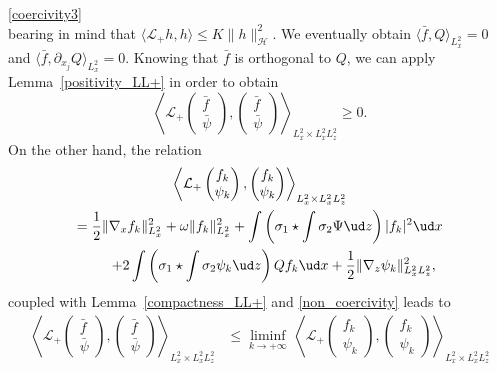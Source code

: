 \begin{ProofOf}{\eqref{coercivity3}}
\[\]
bearing in mind that $\langle\mathcal{L}_{+} h,h\rangle\leq K\|h\|_{\mathscr{H}}^{2}$. We eventually obtain $\langle\bar{f},Q\rangle_{L_{x}^{2}}=0$ and $\langle\bar{f},\partial_{x_{j}}Q\rangle_{L_{x}^{2}}=0$. Knowing that $\bar{f}$ is orthogonal to $Q$, we can apply Lemma~\ref{positivity_LL+} in order to obtain
\[
\left\langle\mathcal{L}_{+}\begin{pmatrix} \bar{f}\\\bar{\psi} \end{pmatrix},\begin{pmatrix} \bar{f}\\\bar{\psi} \end{pmatrix}\right\rangle_{L_{x}^{2}\times L_{x}^{2}L_{z}^{2}}\geq 0.
\]
On the other hand, the relation
\begin{multline*}
\left\langle\mathcal{L}_{+}\begin{pmatrix} f_{k}\\\psi_{k} \end{pmatrix},\begin{pmatrix} f_{k}\\\psi_{k} \end{pmatrix}\right\rangle_{L_{x}^{2}\times L_{x}^{2}L_{z}^{2}}
\\
=\frac{1}{2}\|\nabla_{x}f_{k}\|_{L_{x}^{2}}^{2}+\omega\|f_{k}\|_{L_{x}^{2}}^{2}+\int\left(\sigma_{1}\star\int\sigma_{2}\Psi\ud z\right)|f_{k}|^{2}\ud x\\
\qquad +2\int\left(\sigma_{1}\star\int\sigma_{2}\psi_{k}\ud z\right)Qf_{k}\ud x+\frac{1}{2}\|\nabla_{z}\psi_{k}\|_{L_{x}^{2}L_{z}^{2}}^{2},
\end{multline*}
coupled with Lemma~\ref{compactness_LL+} and \eqref{non_coercivity} leads to
\begin{align*}
\left\langle\mathcal{L}_{+}\begin{pmatrix} \bar{f}\\\bar{\psi} \end{pmatrix},\begin{pmatrix} \bar{f}\\\bar{\psi} \end{pmatrix}\right\rangle_{L_{x}^{2}\times L_{x}^{2}L_{z}^{2}}&\leq\underset{k\to+\infty}{\liminf}\,\left\langle\mathcal{L}_{+}\begin{pmatrix} f_{k}\\\psi_{k} \end{pmatrix},\begin{pmatrix} f_{k}\\\psi_{k} \end{pmatrix}\right\rangle_{L_{x}^{2}\times L_{x}^{2}L_{z}^{2}}\\

\end{align*}
\end{ProofOf}
